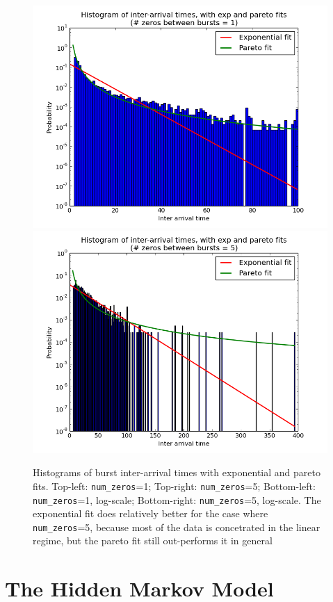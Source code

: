 \documentclass[11pt, twoside]{article}
\begin{document}
\begin{figure}[h!]
	\includegraphics[scale = 0.35]{ipt-1-log}
	\includegraphics[scale = 0.35]{ipt-5-log}
	\caption{Histograms of burst inter-arrival times with exponential and pareto fits. Top-left: \texttt{num\_zeros}=1; Top-right: \texttt{num\_zeros}=5; Bottom-left: \texttt{num\_zeros}=1, log-scale; Bottom-right: \texttt{num\_zeros}=5, log-scale. The exponential fit does relatively better for the case where \texttt{num\_zeros}=5, because most of the data is concetrated in the linear regime, but the pareto fit still out-performs it in general}
	\label{fig:burst-statistics}
\end{figure}

\section{The Hidden Markov Model}
\end{document}

